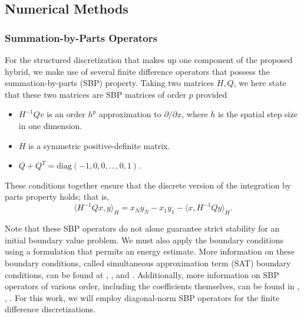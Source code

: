 \subsection{Numerical Methods}

\subsubsection{Summation-by-Parts Operators}

For the structured discretization that makes up one component of the proposed hybrid, we make use of several
finite difference operators that possess the summation-by-parts (SBP) property. Taking two matrices
${H,Q}$, we here state that these two matrices are SBP matrices of order $p$ provided 
\begin{itemize}
\item $H^{-1}Q v$ is an order $h^{p}$ approximation to $\partial/\partial x$, where $h$ is the spatial step size in one dimension.
\item $H$ is a symmetric positive-definite matrix.
\item $Q + Q^{T} = \text{diag}(-1,0,0,...,0,1)$.
\end{itemize}
These conditions together ensure that the discrete version of the integration by parts property holds; that is,
\[\langle H^{-1}Q x , y\rangle_{H} = x_{N} y_{N} -  x_{1} y_{1} - \langle x,H^{-1}Q y\rangle _{H}. \]

Note that these SBP operators do not alone guarantee strict
stability for an initial boundary value problem. We must also apply the boundary conditions using a
formulation that permits an energy estimate. More information on these boundary conditions, called
simultaneous approximation term (SAT) boundary conditions, can be found at \cite{svard2007stable},
\cite{svard2008stable}, and \cite{bodony2010accuracy}. Additionally, more information on SBP operators
of various order, including the coefficients themselves, can be found
in \cite{strand1994summation}, \cite{carpenter1993time}, \cite{mattsson2004stable}. For this work,
we will employ diagonal-norm SBP operators for the finite difference discretizations.

